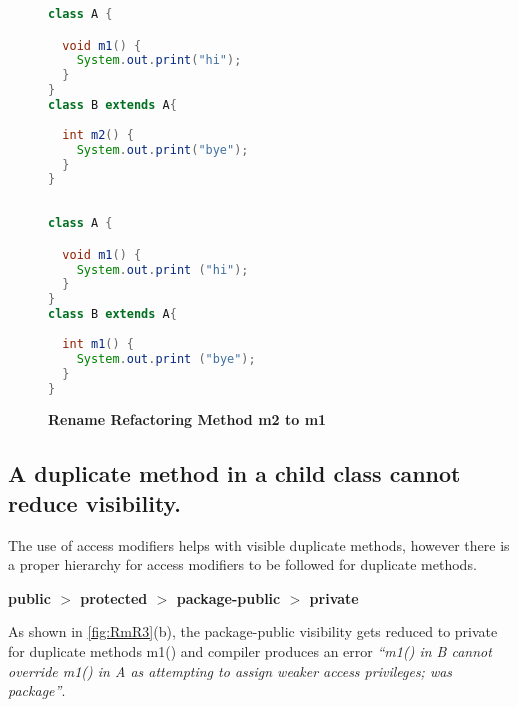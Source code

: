 \begin{figure}[th]
\centering
\begin{minipage}[t]{0.47\linewidth}
\begin{lstlisting}[language=java, basicstyle=\scriptsize\ttfamily,frame=single]
class A {

  void m1() {
    System.out.print("hi");
  }
}
class B extends A{
 
  int m2() {
    System.out.print("bye");
  }	
}
 
\end{lstlisting}
\end{minipage}
\hfill
\begin{minipage}[t]{0.47\linewidth}
\begin{lstlisting}[language=java, basicstyle=\scriptsize\ttfamily,frame=single]
class A {

  void m1() {
    System.out.print ("hi");
  }
}
class B extends A{
 
  int m1() {
    System.out.print ("bye");
  }	
}

\end{lstlisting}
\end{minipage}
\caption{\textbf{Rename Refactoring Method m2 to m1}}
\label{fig:RmR2}
\end{figure}

\subsection{A duplicate method in a child class cannot reduce visibility.}

The use of access modifiers helps with visible duplicate methods, however there is a proper hierarchy for access modifiers to be followed for duplicate methods.


\begin{center}
\textbf{public $>$ protected $>$ package-public $>$ private}
\end{center}


As shown in \ref{fig:RmR3}(b), the package-public visibility gets reduced to private for duplicate methods m1() and compiler produces an error \textsl{``m1() in B cannot override m1() in A as attempting to assign weaker access privileges; was package''}. 

